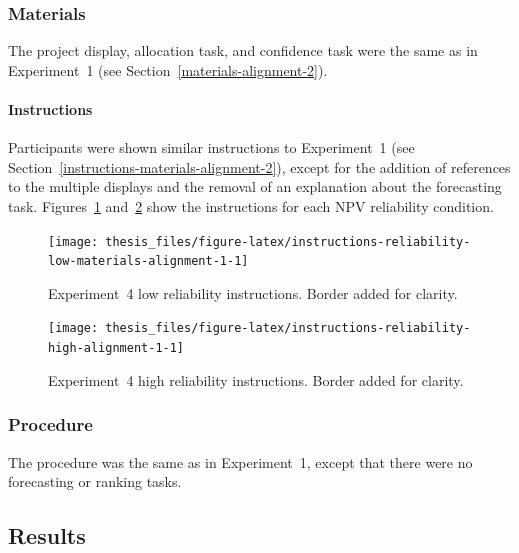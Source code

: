 \documentclass[a4paper, nobind, dvipsnames]{templates/ociamthesis}
\theoremstyle{definition}
\theoremstyle{definition}
\theoremstyle{definition}
\theoremstyle{definition}
\theoremstyle{remark}
\begin{document}
\subsubsection{Materials}

The project display, allocation task, and confidence task were the same as in
Experiment~1 (see Section~\ref{materials-alignment-2}).

\paragraph{Instructions}

Participants were shown similar instructions to Experiment~1 (see
Section~\ref{instructions-materials-alignment-2}), except for the addition of
references to the multiple displays and the removal of an explanation about the
forecasting task.
Figures~\ref{fig:instructions-reliability-low-materials-alignment-1}
and~\ref{fig:instructions-reliability-high-alignment-1} show the instructions
for each NPV reliability condition.



\begin{figure}
\texttt{[image: thesis\_files/figure-latex/instructions-reliability-low-materials-alignment-1-1]} \caption{Experiment~4 low reliability instructions. Border added for clarity.}\label{fig:instructions-reliability-low-materials-alignment-1}
\end{figure}



\begin{figure}
\texttt{[image: thesis\_files/figure-latex/instructions-reliability-high-alignment-1-1]} \caption{Experiment~4 high reliability instructions. Border added for clarity.}\label{fig:instructions-reliability-high-alignment-1}
\end{figure}

\subsubsection{Procedure}

The procedure was the same as in Experiment~1, except that there were no
forecasting or ranking tasks.

\hypertarget{results-alignment-1}{%
\subsection{Results}\label{results-alignment-1}}
\end{document}
